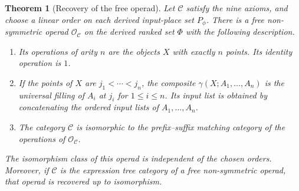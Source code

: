 \documentclass[11pt,a4paper]{article}
\theoremstyle{plain}
\newtheorem{theorem}{Theorem}[section]
\theoremstyle{definition}
\theoremstyle{remark}
\newcommand{\C}{\mathcal C}
\newcommand{\one}{1}
\begin{document}
\begin{theorem}[Recovery of the free operad]\label{thm:operad-recovery}
Let $\C$ satisfy the nine axioms, and choose a linear order on each
derived input-place set $P_\phi$. There is a free non-symmetric
operad $\mathcal O_\C$ on the derived ranked set $\Phi$ with the
following description.
\begin{enumerate}
\item Its operations of arity $n$ are the objects $X$ with exactly
$n$ points. Its identity operation is $\one$.
\item If the points of $X$ are $j_1<\cdots<j_n$, the composite
$\gamma(X;A_1,\ldots,A_n)$ is the universal filling of $A_i$ at
$j_i$ for $1\le i\le n$. Its input list is obtained by concatenating
the ordered input lists of $A_1,\ldots,A_n$.
\item The category $\C$ is isomorphic to the prefix--suffix
matching category of the operations of $\mathcal O_\C$.
\end{enumerate}
The isomorphism class of this operad is independent of the chosen
orders. Moreover, if $\C$ is the expression tree category of a
free non-symmetric operad, that operad is recovered up to isomorphism.
\end{theorem}
\end{document}
